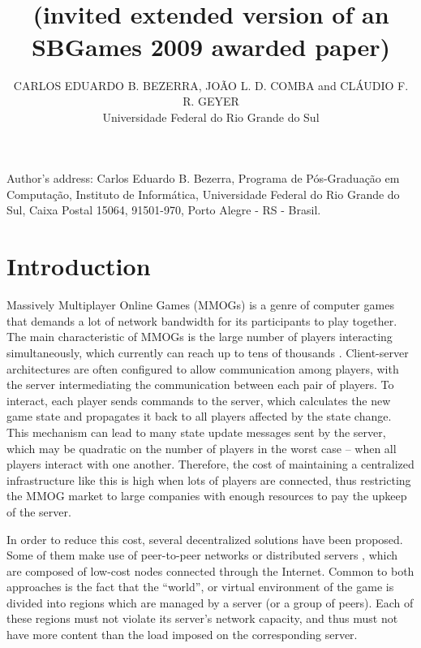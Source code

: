 \documentclass[acmjacm]{acmtrans2m}
\title{\titulo{}\\ \large{(invited extended version of an SBGames 2009 awarded paper)}}
\author{CARLOS EDUARDO B. BEZERRA, JOÃO L. D. COMBA and CLÁUDIO F. R. GEYER\\Universidade Federal do Rio Grande do Sul}
\let\mycounter\setcounter
\begin{document}
\setcounter{page}{1}



{\let\setcounter\mycounter
    \begin{bottomstuff}
    	Author's address: Carlos Eduardo B. Bezerra, Programa de Pós-Graduação em Computação,
		Instituto de Informática, Universidade Federal do Rio Grande do Sul,
		Caixa Postal 15064, 91501-970, Porto Alegre - RS - Brasil.
    \end{bottomstuff}
}

\maketitle


\section{Introduction}

Massively Multiplayer Online Games (MMOGs) is a genre of computer games that demands a lot of network bandwidth for its participants to play together. The main characteristic of MMOGs is the large number of players interacting simultaneously, which currently can reach up to tens of thousands \cite{schiele2007rpp}. Client-server architectures are often configured to allow communication among players, with the server intermediating the communication between each pair of players. To interact, each player sends commands to the server, which calculates the new game state and propagates it back to all players affected by the state change. This mechanism can lead to many state update messages sent by the server, which may be quadratic on the number of players in the worst case -- when all players interact with one another. Therefore, the cost of maintaining a centralized infrastructure like this is high when lots of players are connected, thus restricting the MMOG market to large companies with enough resources to pay the upkeep of the server.

In order to reduce this cost, several decentralized solutions have been proposed. Some of them make use of peer-to-peer networks \cite{schiele2007rpp,rieche2007ppb,hampel2006ppa,elrhalibi2005abm,iimura2004zfg,knutsson2004pps} or distributed servers
\cite{ng2002msa,chertov:olb,lee2003sdl,assiotis2006dam},
which are composed of low-cost nodes connected through the Internet. Common to both approaches is the fact that the ``world'', or virtual environment of the game is divided into regions which are managed by a server (or a group of peers). Each of these regions must not violate its server's network capacity, and thus must not have more content than the load imposed on the corresponding server.
\end{document}
